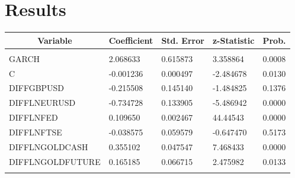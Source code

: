 \documentclass[11pt]{report}
\begin{document}
\section{Results}

\begin{table}[!h]
\centering
\begin{tabular}{lllll}
\hline
\multicolumn{1}{|c|}{Variable} & \multicolumn{1}{|c|}{Coefficient} & \multicolumn{1}{|c|}{Std. Error} & \multicolumn{1}{|c|}{z-Statistic} & \multicolumn{1}{|c|}{Prob.} \\ \hline
                               &                                  &                                 &                                  &                            \\
GARCH                          & 2.068633                         & 0.615873                        & 3.358864                         & 0.0008                     \\
C                              & -0.001236                        & 0.000497                        & -2.484678                        & 0.0130                     \\
DIFFGBPUSD                     & -0.215508                        & 0.145140                        & -1.484825                        & 0.1376                     \\
DIFFLNEURUSD                   & -0.734728                        & 0.133905                        & -5.486942                        & 0.0000                     \\
DIFFLNFED                      & 0.109650                         & 0.002467                        & 44.44543                         & 0.0000                     \\
DIFFLNFTSE                     & -0.038575                        & 0.059579                        & -0.647470                        & 0.5173                     \\
DIFFLNGOLDCASH                 & 0.355102                         & 0.047547                        & 7.468433                         & 0.0000                     \\
DIFFLNGOLDFUTURE               & 0.165185                         & 0.066715                        & 2.475982                         & 0.0133                     \\
                               &                                  &                                 &                                  &                            \\ \hline

\end{tabular}
\end{table}
\end{document}
